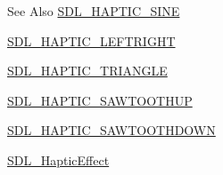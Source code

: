 \begin{DoxySeeAlso}{See Also}
\hyperlink{_s_d_l__haptic_8h_aa6d75adbfcdda5075078e7a2849da5c0}{S\-D\-L\-\_\-\-H\-A\-P\-T\-I\-C\-\_\-\-S\-I\-N\-E} 

\hyperlink{_s_d_l__haptic_8h_ae047624d8458ff6400887c37a36f86d3}{S\-D\-L\-\_\-\-H\-A\-P\-T\-I\-C\-\_\-\-L\-E\-F\-T\-R\-I\-G\-H\-T} 

\hyperlink{_s_d_l__haptic_8h_ae8123eaa51511507375ba6ef9220fa46}{S\-D\-L\-\_\-\-H\-A\-P\-T\-I\-C\-\_\-\-T\-R\-I\-A\-N\-G\-L\-E} 

\hyperlink{_s_d_l__haptic_8h_ab8e3f40f3c2bcee8905d13b634363c3f}{S\-D\-L\-\_\-\-H\-A\-P\-T\-I\-C\-\_\-\-S\-A\-W\-T\-O\-O\-T\-H\-U\-P} 

\hyperlink{_s_d_l__haptic_8h_afd64aa747034a7ccf4b55f6246525701}{S\-D\-L\-\_\-\-H\-A\-P\-T\-I\-C\-\_\-\-S\-A\-W\-T\-O\-O\-T\-H\-D\-O\-W\-N} 

\hyperlink{union_s_d_l___haptic_effect}{S\-D\-L\-\_\-\-Haptic\-Effect} 
\end{DoxySeeAlso}


